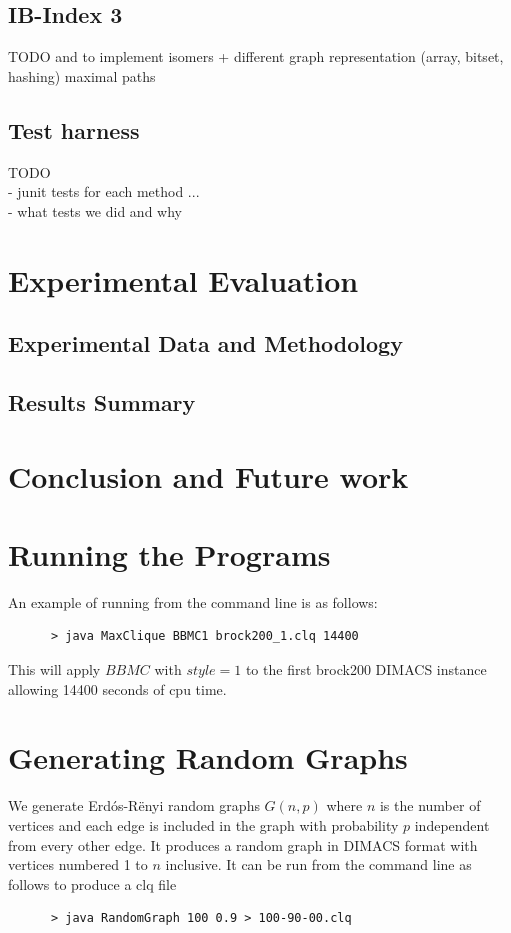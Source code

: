 \documentclass{l4proj}
\theoremstyle{definition}
\begin{document}
\section{IB-Index 3}
TODO and to implement
isomers + different graph representation (array, bitset, hashing)
maximal paths
        
\section{Test harness}
TODO \\
- junit tests for each method ...\\
- what tests we did and why\\


\chapter{Experimental Evaluation}
    \section{Experimental Data and Methodology}
    \section{Results Summary}
    
\chapter{Conclusion and Future work}

\begin{appendices}

\chapter{Running the Programs}
An example of running from the command line is as follows:
\begin{verbatim}
      > java MaxClique BBMC1 brock200_1.clq 14400
\end{verbatim}
This will apply $BBMC$ with $style = 1$ to the first brock200 DIMACS instance allowing 14400 seconds of cpu time.

\chapter{Generating Random Graphs}
\label{sec:randomGraph}
We generate Erd\'{o}s-R\"{e}nyi random graphs $G(n,p)$ where $n$ is the number of vertices and
each edge is included in the graph with probability $p$ independent from every other edge. It produces
a random graph in DIMACS format with vertices numbered 1 to $n$ inclusive. It can be run from the command line as follows to produce 
a clq file
\begin{verbatim}
      > java RandomGraph 100 0.9 > 100-90-00.clq
\end{verbatim}
\end{appendices}




\end{document}

